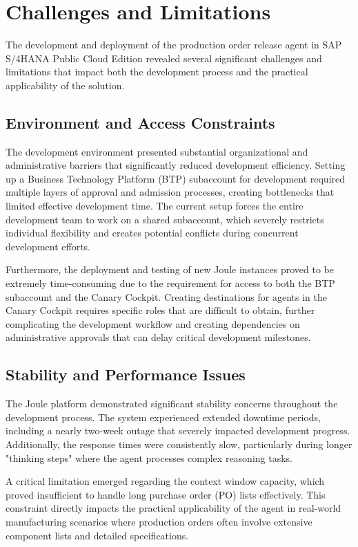 \section{Challenges and Limitations}

The development and deployment of the production order release agent in SAP S/4HANA Public Cloud Edition revealed several significant challenges and limitations that impact both the development process and the practical applicability of the solution.

\subsection{Environment and Access Constraints}

The development environment presented substantial organizational and administrative barriers that significantly reduced development efficiency. Setting up a Business Technology Platform (BTP) subaccount for development required multiple layers of approval and admission processes, creating bottlenecks that limited effective development time. The current setup forces the entire development team to work on a shared subaccount, which severely restricts individual flexibility and creates potential conflicts during concurrent development efforts.

Furthermore, the deployment and testing of new Joule instances proved to be extremely time-consuming due to the requirement for access to both the BTP subaccount and the Canary Cockpit. Creating destinations for agents in the Canary Cockpit requires specific roles that are difficult to obtain, further complicating the development workflow and creating dependencies on administrative approvals that can delay critical development milestones.

\subsection{Stability and Performance Issues}

The Joule platform demonstrated significant stability concerns throughout the development process. The system experienced extended downtime periods, including a nearly two-week outage that severely impacted development progress. Additionally, the response times were consistently slow, particularly during longer "thinking steps" where the agent processes complex reasoning tasks.

A critical limitation emerged regarding the context window capacity, which proved insufficient to handle long purchase order (PO) lists effectively. This constraint directly impacts the practical applicability of the agent in real-world manufacturing scenarios where production orders often involve extensive component lists and detailed specifications.

